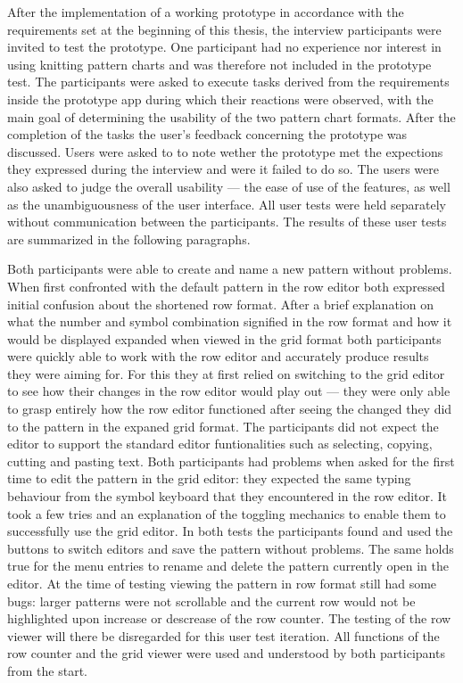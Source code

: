 After the implementation of a working prototype in accordance with the requirements set at the beginning of this thesis, the interview participants were invited to test the prototype. One participant had no experience nor interest in using knitting pattern charts and was therefore not included in the prototype test.
The participants were asked to execute tasks derived from the requirements inside the prototype app during which their reactions were observed, with the main goal of determining the usability of the two pattern chart formats. After the completion of the tasks the user's feedback concerning the prototype was discussed. Users were asked to to note wether the prototype met the expections they expressed during the interview and were it failed to do so. The users were also asked to judge the overall usability --- the ease of use of the features, as well as the unambiguousness of the user interface. All user tests were held separately without communication between the participants. The results of these user tests are summarized in the following paragraphs.

Both participants were able to create and name a new pattern without problems. When first confronted with the default pattern in the row editor both expressed initial confusion about the shortened row format. After a brief explanation on what the number and symbol combination signified in the row format and how it would be displayed expanded when viewed in the grid format both participants were quickly able to work with the row editor and accurately produce results they were aiming for. For this they at first relied on switching to the grid editor to see how their changes in the row editor would play out --- they were only able to grasp entirely how the row editor functioned after seeing the changed they did to the pattern in the expaned grid format. The participants did not expect the editor to support the standard editor funtionalities such as selecting, copying, cutting and pasting text. 
Both participants had problems when asked for the first time to edit the pattern in the grid editor: they expected the same typing behaviour from the symbol keyboard that they encountered in the row editor. It took a few tries and an explanation of the toggling mechanics to enable them to successfully use the grid editor. In both tests the participants found and used the buttons to switch editors and save the pattern without problems. The same holds true for the menu entries to rename and delete the pattern currently open in the editor.
At the time of testing viewing the pattern in row format still had some bugs: larger patterns were not scrollable and the current row would not be highlighted upon increase or descrease of the row counter. The testing of the row viewer will there be disregarded for this user test iteration. All functions of the row counter and the grid viewer were used and understood by both participants from the start. 

